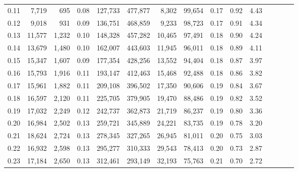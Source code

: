 \begin{tabular}{rrrcrrrrrrrrrrr}
0.11 &   7,719 &    695 &                                       0.08 &  127,733 &  477,877 &    8,302 &   99,654 &  0.17 &  0.92 &                         4.43 \\
0.12 &   9,018 &    931 &                                       0.09 &  136,751 &  468,859 &    9,233 &   98,723 &  0.17 &  0.91 &                         4.34 \\
0.13 &  11,577 &  1,232 &                                       0.10 &  148,328 &  457,282 &   10,465 &   97,491 &  0.18 &  0.90 &                         4.24 \\
0.14 &  13,679 &  1,480 &                                       0.10 &  162,007 &  443,603 &   11,945 &   96,011 &  0.18 &  0.89 &                         4.11 \\
0.15 &  15,347 &  1,607 &                                       0.09 &  177,354 &  428,256 &   13,552 &   94,404 &  0.18 &  0.87 &                         3.97 \\
0.16 &  15,793 &  1,916 &                                       0.11 &  193,147 &  412,463 &   15,468 &   92,488 &  0.18 &  0.86 &                         3.82 \\
0.17 &  15,961 &  1,882 &                                       0.11 &  209,108 &  396,502 &   17,350 &   90,606 &  0.19 &  0.84 &                         3.67 \\
0.18 &  16,597 &  2,120 &                                       0.11 &  225,705 &  379,905 &   19,470 &   88,486 &  0.19 &  0.82 &                         3.52 \\
0.19 &  17,032 &  2,249 &                                       0.12 &  242,737 &  362,873 &   21,719 &   86,237 &  0.19 &  0.80 &                         3.36 \\
0.20 &  16,984 &  2,502 &                                       0.13 &  259,721 &  345,889 &   24,221 &   83,735 &  0.19 &  0.78 &                         3.20 \\
0.21 &  18,624 &  2,724 &                                       0.13 &  278,345 &  327,265 &   26,945 &   81,011 &  0.20 &  0.75 &                         3.03 \\
0.22 &  16,932 &  2,598 &                                       0.13 &  295,277 &  310,333 &   29,543 &   78,413 &  0.20 &  0.73 &                         2.87 \\
0.23 &  17,184 &  2,650 &                                       0.13 &  312,461 &  293,149 &   32,193 &   75,763 &  0.21 &  0.70 &                         2.72 \\

\end{tabular}
